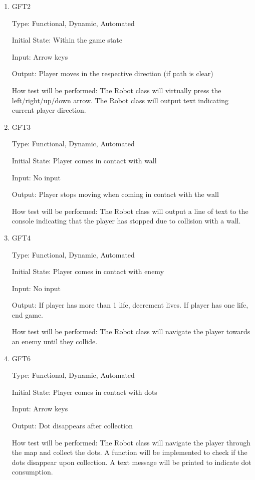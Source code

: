 \documentclass[12pt, titlepage]{article}
\begin{document}
\begin{enumerate}

\item{GFT2\\}

Type: Functional, Dynamic, Automated
					
Initial State: Within the game state
					
Input: Arrow keys
					
Output: Player moves in the respective direction (if path is clear)
					
How test will be performed: The Robot class will virtually press the left/right/up/down arrow. The Robot class will output text indicating current player direction.

\item{GFT3\\}

Type: Functional, Dynamic, Automated
					
Initial State: Player comes in contact with wall
					
Input: No input
					
Output: Player stops moving when coming in contact with the wall

How test will be performed: The Robot class will output a line of text to the console indicating that the player has stopped due to collision with a wall.

\item{GFT4\\}

Type: Functional, Dynamic, Automated
					
Initial State: Player comes in contact with enemy
					
Input: No input
					
Output: If player has more than 1 life, decrement lives. If player has one life, end game.

How test will be performed: The Robot class will navigate the player towards an enemy until they collide.


\item{GFT6\\}

Type: Functional, Dynamic, Automated
					
Initial State: Player comes in contact with dots
					
Input: Arrow keys
					
Output: Dot disappears after collection

How test will be performed: The Robot class will navigate the player through the map and collect the dots. A function will be implemented to check if the dots disappear upon collection. A text message will be printed to indicate dot consumption.


\end{enumerate}
\end{document}
